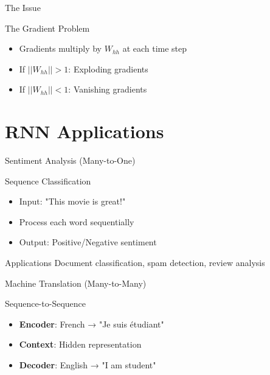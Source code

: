 \documentclass[usenames,dvipsnames]{beamer}
\begin{document}

	\begin{frame}{The Issue}
	\begin{alertbox}{The Gradient Problem}
			\begin{itemize}
				\item Gradients multiply by $W_{hh}$ at each time step
				\item If $||W_{hh}|| > 1$: Exploding gradients
				\item If $||W_{hh}|| < 1$: Vanishing gradients
			\end{itemize}
		\end{alertbox}
	\end{frame}
	\section{RNN Applications}
	
	\begin{frame}{Sentiment Analysis (Many-to-One)}
		\begin{examplebox}{Sequence Classification}
			\begin{itemize}
				\item Input: "This movie is great!"
				\item Process each word sequentially
				\item Output: Positive/Negative sentiment
			\end{itemize}
		\end{examplebox}
		
		\begin{keypointsbox}{Applications}
			Document classification, spam detection, review analysis
		\end{keypointsbox}
	\end{frame}
	
	\begin{frame}{Machine Translation (Many-to-Many)}
		\begin{examplebox}{Sequence-to-Sequence}
			\begin{itemize}
				\item \textbf{Encoder}: French → "Je suis étudiant"
				\item \textbf{Context}: Hidden representation
				\item \textbf{Decoder}: English → "I am student"
			\end{itemize}
		\end{examplebox}
	\end{frame}
	
\end{document}
